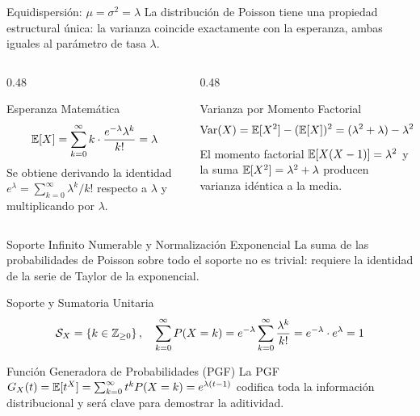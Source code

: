 \documentclass[10pt, aspectratio=169]{beamer}
\begin{document}
\begin{frame}{Equidispersión: $\mu = \sigma^{2} = \lambda$}
  \footnotesize
  La distribución de Poisson tiene una propiedad estructural única: la varianza coincide exactamente con la esperanza, ambas iguales al parámetro de tasa $\lambda$. \pause

  \vspace{0.1cm}
  \begin{columns}[T]
    \begin{column}{0.48\textwidth}
      \begin{block}{Esperanza Matemática}
        $$\mathbb{E}[X] = \sum_{k=0}^{\infty} k \cdot \dfrac{e^{-\lambda} \lambda^{k}}{k!} = \lambda$$
        Se obtiene derivando la identidad $e^{\lambda} = \sum_{k=0}^{\infty} \lambda^{k}/k!$ respecto a $\lambda$ y multiplicando por $\lambda$.
      \end{block}
    \end{column}
    \begin{column}{0.48\textwidth}
      \begin{alertblock}{Varianza por Momento Factorial}
        $$\operatorname{Var}(X) = \mathbb{E}[X^{2}] - (\mathbb{E}[X])^{2} = (\lambda^{2} + \lambda) - \lambda^{2} = \lambda$$
        El momento factorial $\mathbb{E}[X(X-1)] = \lambda^{2}$ y la suma $\mathbb{E}[X^{2}] = \lambda^{2} + \lambda$ producen varianza idéntica a la media.
      \end{alertblock}
    \end{column}
  \end{columns}
\end{frame}

\begin{frame}{Soporte Infinito Numerable y Normalización Exponencial}
  \footnotesize
  La suma de las probabilidades de Poisson sobre todo el soporte no es trivial: requiere la identidad de la serie de Taylor de la exponencial. \pause

  \vspace{0.1cm}
  \begin{block}{Soporte y Sumatoria Unitaria}
    $$\mathcal{S}_X = \left\{ k \in \mathbb{Z}_{\ge 0} \right\}, \quad \sum_{k=0}^{\infty} P(X = k) = e^{-\lambda} \sum_{k=0}^{\infty} \dfrac{\lambda^{k}}{k!} = e^{-\lambda} \cdot e^{\lambda} = 1$$
  \end{block}

  \vspace{0.1cm}
  \pause
  \begin{alertblock}{Función Generadora de Probabilidades (PGF)}
    La PGF $G_{X}(t) = \mathbb{E}[t^{X}] = \sum_{k=0}^{\infty} t^{k} P(X=k) = e^{\lambda(t-1)}$ codifica toda la información distribucional y será clave para demostrar la aditividad.
  \end{alertblock}
\end{frame}
\end{document}

